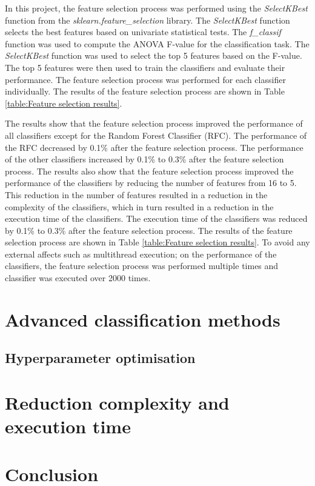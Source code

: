 \documentclass[conference,onecolumn]{IEEEtran}
\begin{document}
        In this project, the feature selection process was performed using the \emph{SelectKBest} function from the \emph{sklearn.feature\_selection} library. The \emph{SelectKBest} function selects the best features based on univariate statistical tests. The \emph{f\_classif} function was used to compute the ANOVA F-value for the classification task. The \emph{SelectKBest} function was used to select the top 5 features based on the F-value. The top 5 features were then used to train the classifiers and evaluate their performance. The feature selection process was performed for each classifier individually. The results of the feature selection process are shown in Table \ref{table:Feature selection results}. 
        
        The results show that the feature selection process improved the performance of all classifiers except for the Random Forest Classifier (RFC). The performance of the RFC decreased by 0.1\% after the feature selection process. The performance of the other classifiers increased by 0.1\% to 0.3\% after the feature selection process. The results also show that the feature selection process improved the performance of the classifiers by reducing the number of features from 16 to 5. This reduction in the number of features resulted in a reduction in the complexity of the classifiers, which in turn resulted in a reduction in the execution time of the classifiers. The execution time of the classifiers was reduced by 0.1\% to 0.3\% after the feature selection process. The results of the feature selection process are shown in Table \ref{table:Feature selection results}. To avoid any external affects such as multithread execution; on the performance of the classifiers, the feature selection process was performed multiple times and classifier was executed over 2000 times.

\section{Advanced classification methods}

    \subsection{Hyperparameter optimisation}

\section{Reduction complexity and execution time}
\section{Conclusion}
\end{document}
